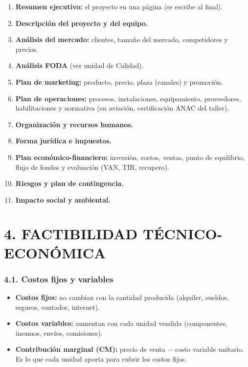 \begin{enumerate}
  \item \textbf{Resumen ejecutivo:} el proyecto en una página (se escribe al final).
  \item \textbf{Descripción del proyecto y del equipo.}
  \item \textbf{Análisis del mercado:} clientes, tamaño del mercado, competidores y precios.
  \item \textbf{Análisis FODA} (ver unidad de Calidad).
  \item \textbf{Plan de marketing:} producto, precio, plaza (canales) y promoción.
  \item \textbf{Plan de operaciones:} procesos, instalaciones, equipamiento, proveedores,
        habilitaciones y normativa (en aviación, certificación ANAC del taller).
  \item \textbf{Organización y recursos humanos.}
  \item \textbf{Forma jurídica e impuestos.}
  \item \textbf{Plan económico-financiero:} inversión, costos, ventas, punto de equilibrio,
        flujo de fondos y evaluación (VAN, TIR, recupero).
  \item \textbf{Riesgos y plan de contingencia.}
  \item \textbf{Impacto social y ambiental.}
\end{enumerate}

\section*{4. FACTIBILIDAD TÉCNICO-ECONÓMICA}

\subsubsection*{4.1. Costos fijos y variables}
\begin{itemize}
  \item \textbf{Costos fijos:} no cambian con la cantidad producida (alquiler, sueldos,
        seguros, contador, internet).
  \item \textbf{Costos variables:} aumentan con cada unidad vendida (componentes, insumos,
        envíos, comisiones).
  \item \textbf{Contribución marginal (CM):} precio de venta $-$ costo variable unitario. Es
        lo que cada unidad aporta para cubrir los costos fijos.
\end{itemize}

